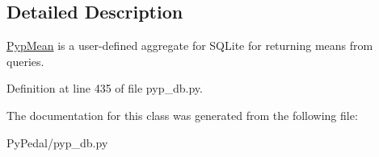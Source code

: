 \subsection{Detailed Description}
\hyperlink{classPyPedal_1_1pyp__db_1_1PypMean}{PypMean} is a user-defined aggregate for SQLite for returning means from queries. 

Definition at line 435 of file pyp\_\-db.py.

The documentation for this class was generated from the following file:\begin{CompactItemize}
\item 
PyPedal/pyp\_\-db.py\end{CompactItemize}
